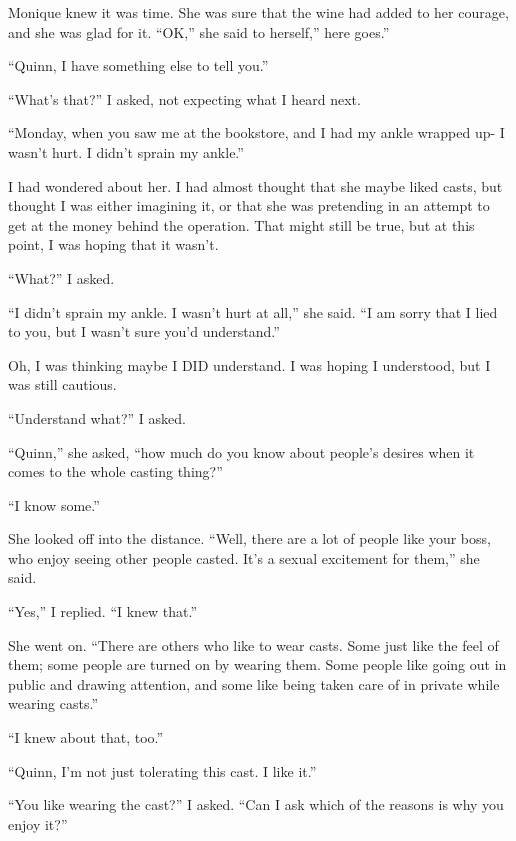 \begin{thought}
Monique knew it was time. She was sure that the wine had added to her courage, and she was
glad for it. ``OK,'' she said to herself,'' here goes.''
\end{thought}

``Quinn, I have something else to tell you.''

``What's that?'' I asked, not expecting what I heard next.

``Monday, when you saw me at the bookstore, and I had my ankle wrapped up- I wasn't hurt.
I didn't sprain my ankle.''

I had wondered about her. I had almost thought that she maybe liked casts, but thought I
was either imagining it, or that she was pretending in an attempt to get at the money behind the
operation. That might still be true, but at this point, I was hoping that it wasn't.

``What?'' I asked.

``I didn't sprain my ankle. I wasn't hurt at all,'' she said. ``I am sorry that I lied to
you, but I wasn't sure you'd understand.''

Oh, I was thinking maybe I DID understand. I was hoping I understood, but I was still
cautious.

``Understand what?'' I asked.

``Quinn,'' she asked, ``how much do you know about people's desires when it comes to the
whole casting thing?''

``I know some.''

She looked off into the distance. ``Well, there are a lot of people like your boss, who
enjoy seeing other people casted. It's a sexual excitement for them,'' she said.

``Yes,'' I replied. ``I knew that.''

She went on. ``There are others who like to wear casts. Some just like the feel of them;
some people are turned on by wearing them. Some people like going out in public and drawing
attention, and some like being taken care of in private while wearing casts.''

``I knew about that, too.''

``Quinn, I'm not just tolerating this cast. I like it.'' 

``You like wearing the cast?'' I asked. ``Can I ask which of the reasons is why you enjoy
it?''

